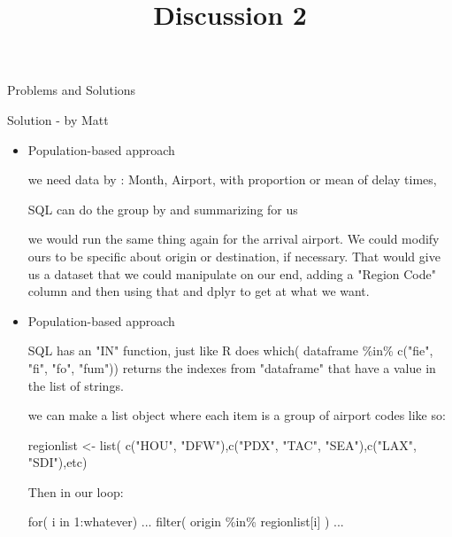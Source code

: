 \documentclass[12pt]{article}
\begin{document}
\title{Discussion 2}
\maketitle

Problems and Solutions 

Solution - by Matt

\begin{itemize}
\item Population-based approach  

we need data by :
Month, Airport, with proportion or mean of delay times,

SQL can do the group by and summarizing for us

we would run the same thing again for the arrival airport. We could modify ours to be specific about origin or destination, if necessary. That would give us a dataset that we could manipulate on our end, adding a "Region Code" column and then using that and dplyr to get at what we want. 

\item Population-based approach  

SQL has an "IN" function, just like R does
which( dataframe \%in\% c("fie", "fi", "fo", "fum")) returns the indexes from "dataframe" that have a value in the list of strings. 

we can make a list object where each item is a group of airport codes like so:

regionlist <- list(  c("HOU", "DFW"),c("PDX", "TAC", "SEA"),c("LAX", "SDI"),etc)

Then in our loop:

for( i in 1:whatever) {
    ...
    filter( origin \%in\% regionlist[i] )
    ...
}

\end{itemize}
\end{document}
